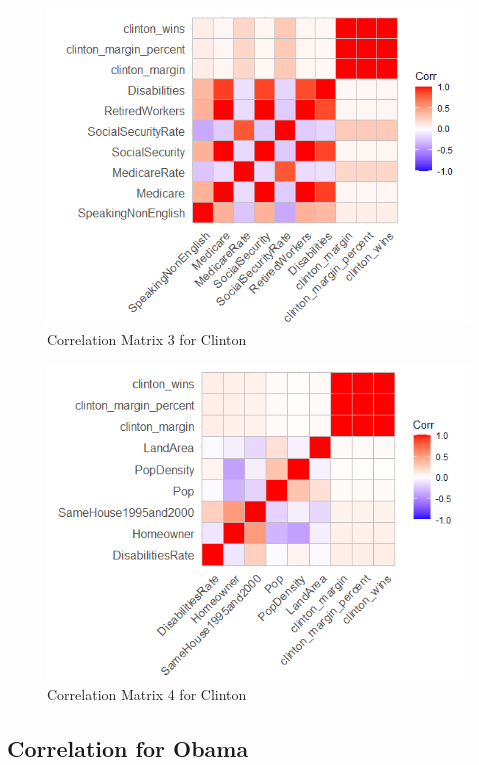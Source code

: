 \documentclass[11pt]{article}
\begin{document}
\begin{figure}[H]
    \centering
    \includegraphics[width=0.90\columnwidth]{assets/cc3.PNG}
    \caption{Correlation Matrix 3 for Clinton}
    \label{lr}
\end{figure}

\begin{figure}[H]
    \centering
    \includegraphics[width=0.90\columnwidth]{assets/cc4.PNG}
    \caption{Correlation Matrix 4 for Clinton}
    \label{lr}
\end{figure}

\subsection{Correlation for Obama}
\end{document}

